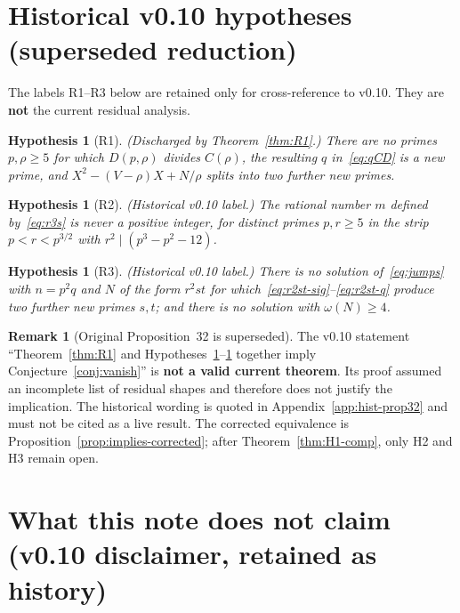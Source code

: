 \documentclass[11pt,reqno]{amsart}
\theoremstyle{definition}
\newtheorem{hypothesis}[theorem]{Hypothesis}
\newtheorem{remark}[theorem]{Remark}
\begin{document}
\section{Historical v0.10 hypotheses (superseded reduction)}
\label{sec:conj}

The labels R1--R3 below are retained only for cross-reference to v0.10. They are \textbf{not} the current residual analysis.

\begin{hypothesis}[R1]
\label{hyp:R1}
\itshape (Discharged by Theorem~\ref{thm:R1}.) There are no primes \(p,\rho\ge 5\) for which \(D(p,\rho)\) divides \(C(\rho)\), the resulting \(q\) in~\eqref{eq:qCD} is a new prime, and \(X^2-(V-\rho)X+N/\rho\) splits into two further new primes.
\end{hypothesis}

\begin{hypothesis}[R2]
\label{hyp:R2}
\itshape (Historical v0.10 label.) The rational number \(m\) defined by~\eqref{eq:r3s} is never a positive integer, for distinct primes \(p,r\ge 5\) in the strip \(p<r<p^{3/2}\) with \(r^2\mid(p^3-p^2-12)\).
\end{hypothesis}

\begin{hypothesis}[R3]
\label{hyp:R3}
\itshape (Historical v0.10 label.) There is no solution of~\eqref{eq:jumps} with \(n=p^2q\) and \(N\) of the form \(r^2st\) for which~\eqref{eq:r2st-sig}--\eqref{eq:r2st-q} produce two further new primes \(s,t\); and there is no solution with \(\omega(N)\ge 4\).
\end{hypothesis}

\begin{remark}[Original Proposition~32 is superseded]
\label{prop:implies}
\label{rem:prop32-gap}
The v0.10 statement ``Theorem~\ref{thm:R1} and Hypotheses~\ref{hyp:R2}--\ref{hyp:R3} together imply Conjecture~\ref{conj:vanish}'' is \textbf{not a valid current theorem}. Its proof assumed an incomplete list of residual shapes and therefore does not justify the implication. The historical wording is quoted in Appendix~\ref{app:hist-prop32} and must not be cited as a live result. The corrected equivalence is Proposition~\ref{prop:implies-corrected}; after Theorem~\ref{thm:H1-comp}, only H2 and H3 remain open.
\end{remark}

\section*{What this note does not claim (v0.10 disclaimer, retained as history)}
\end{document}
